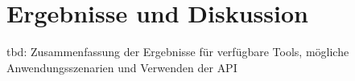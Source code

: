 %

\section{Ergebnisse und Diskussion}
tbd: Zusammenfassung der Ergebnisse für verfügbare Tools, mögliche Anwendungsszenarien und Verwenden der \ac{API}
%
%
